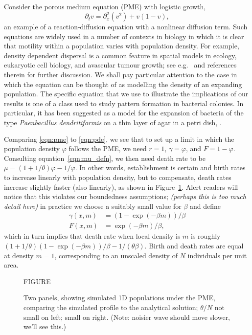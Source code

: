 \documentclass[12pt]{article}
\newcommand{\comment}[1]{{\color{blue} \it #1}}
\begin{document}
Consider the porous medium equation (PME) with logistic growth,
\begin{equation}
    \label{eqn:pme}
    \partial_t v = \partial_x^2 (v^2) + v (1 - v) ,
\end{equation}
an example of a reaction-diffusion equation with a nonlinear diffusion term.
Such equations are widely used in a number of contexts in biology in which
it is clear that motility within a population varies with population density.
For example, density dependent dispersal is a common feature in spatial
models in ecology, eukaryotic cell biology, and avascular tumour growth;
see e.g.~\cite{sherratt:2010} and references therein for further discussion. 
We shall pay particular attention to the case in which the equation can be 
thought of as modelling the density of an expanding population. 
The specific equation that we use to illustrate the implications of
our results is one of a class used to study pattern formation in 
bacterial colonies. In particular, it has been suggested as a model for
the expansion of bacteria of the type {\em Paenbacillus dendritiformis} on
a thin layer of agar in a petri dish, 
\cite{cohen/golding/kozlovsky/benjacob/ron:1999}. 

Comparing \eqref{eqn:pme} to \eqref{eqn:pde},
we see that to set up a limit in which the population density $\varphi$ follows the PME,
we need $r=1$,
$\gamma = \varphi$, and $F = 1 - \varphi$.
Consulting equation~\eqref{eqn:mu_defn},
we then need death rate to be $\mu = (1 + 1/\theta) \varphi - 1/\varphi$.
In other words,
establishment is certain
and birth rates to increase linearly with population density,
but to compensate, death rates increase slightly faster (also linearly),
as shown in Figure~\ref{fig:pme_waves}.
Alert readers will notice that this violates our boundedness assumptions;
\comment{(perhaps this is too much detail here)}
in practice we choose a suitably small value for $\beta$ and define
\begin{align*}
    \gamma(x, m) &= (1 - \exp(- \beta m)) / \beta \\
    F(x, m) &= \exp(- \beta m) / \beta ,
\end{align*}
which in turn implies that death rate when local density is $m$
is roughly $(1 + 1/\theta) (1 - \exp(-\beta m)) / \beta - 1/(\theta \beta)$.
Birth and death rates are equal at density $m = 1$,
corresponding to an unscaled density of $N$ individuals per unit area.

\begin{figure}
    \begin{center}
        FIGURE
    \end{center}
    \caption{
        Two panels, showing simulated 1D populations under the PME, comparing the simulated
        profile to the analytical solution;
        $\theta/N$ not small on left; small on right.
        (Note: noisier wave should move slower, we'll see this.)
        \label{fig:pme_waves}
    }
\end{figure}
\end{document}
